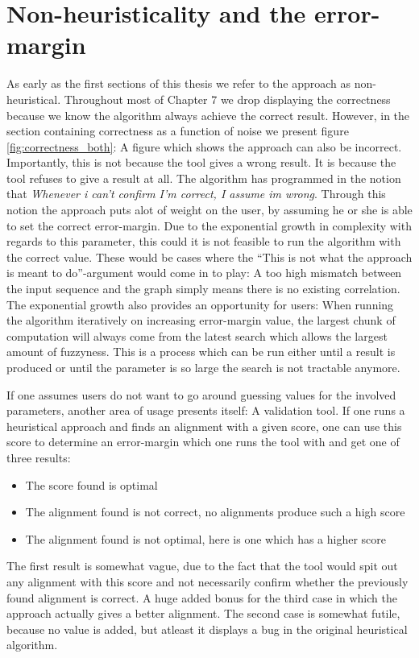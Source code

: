 \documentclass[thesis.tex]{subfiles}
\begin{document}
\section{Non-heuristicality and the error-margin}
As early as the first sections of this thesis we refer to the approach as non-heuristical. Throughout most of Chapter 7 we drop displaying the correctness because we know the algorithm always achieve the correct result. However, in the section containing correctness as a function of noise we present figure \ref{fig:correctness_both}: A figure which shows the approach can also be incorrect. Importantly, this is not because the tool gives a wrong result. It is because the tool refuses to give a result at all. The algorithm has programmed in the notion that \textit{Whenever i can't confirm I'm correct, I assume im wrong}. Through this notion the approach puts alot of weight on the user, by assuming he or she is able to set the correct error-margin. Due to the exponential growth in complexity with regards to this parameter, this could it is not feasible to run the algorithm with the correct value. These would be cases where the ``This is not what the approach is meant to do''-argument would come in to play: A too high mismatch between the input sequence and the graph simply means there is no existing correlation. The exponential growth also provides an opportunity for users: When running the algorithm iteratively on increasing error-margin value, the largest chunk of computation will always come from the latest search which allows the largest amount of fuzzyness. This is a process which can be run either until a result is produced or until the parameter is so large the search is not tractable anymore.\\
\par\noindent
If one assumes users do not want to go around guessing values for the involved parameters, another area of usage presents itself: A validation tool. If one runs a heuristical approach and finds an alignment with a given score, one can use this score to determine an error-margin which one runs the tool with and get one of three results:
\begin{itemize}
  \item The score found is optimal
  \item The alignment found is not correct, no alignments produce such a high score
  \item The alignment found is not optimal, here is one which has a higher score
\end{itemize}
The first result is somewhat vague, due to the fact that the tool would spit out any alignment with this score and not necessarily confirm whether the previously found alignment is correct. A huge added bonus for the third case in which the approach actually gives a better alignment. The second case is somewhat futile, because no value is added, but atleast it displays a bug in the original heuristical algorithm.
\end{document}
